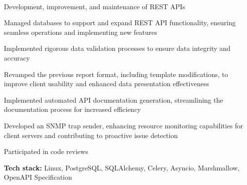 \documentclass[a4paper]{MagicalCV}
\begin{document}
\hfill
\begin{minipage}[t]{0.64\textwidth} 


 \\
\vspace{\topsep} %
\begin{tightemize}
  \item Development, improvement, and maintenance of REST APIs
  \item Managed databases to support and expand REST API functionality, ensuring seamless operations and implementing new features
  \item Implemented rigorous data validation processes to ensure data integrity and accuracy
  \item Revamped the previous report format, including template modifications, to improve client usability and enhanced data presentation effectiveness
  \item Implemented automated API documentation generation, streamlining the documentation process for increased efficiency
  \item Developed an SNMP trap sender, enhancing resource monitoring capabilities for client servers and contributing to proactive issue detection
  \item Participated in code reviews
\end{tightemize}
\textbf{Tech stack:} Linux, PostgreSQL, SQLAlchemy, Celery, Asyncio, Marshmallow, OpenAPI Specification
\sectionsep

 \\
\vspace{\topsep} %


\end{minipage}
\end{document}

